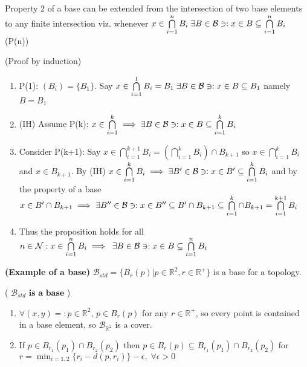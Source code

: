 \documentclass[11pt]{amsart}
\begin{document}
\begin{remark}
Property 2 of a base can be  extended from the  intersection of two base elements to any finite intersection viz. whenever $x \in \bigcap\limits_{i =1}^n B_i \;  \exists B \in \mathcal{B} \ni : x \in B \subseteq  \bigcap\limits_{i  =1}^n B_i$ (P(n))
\begin{verify} (Proof by induction) 
\begin{enumerate}
\item P(1):  $(B_i) = \{B_1\}$. Say $x \in \bigcap\limits_{i  =1}^1 B_i = B_1\;  \exists B \in \mathcal{B} \ni : x \in B \subseteq B_1$ namely $B=B_1$
\item (IH) Assume P(k): $x \in \bigcap\limits_{i  =1}^k \implies  \exists B \in \mathcal{B} \ni : x \in B \subseteq  \bigcap\limits_{i  =1}^k B_i$
\item Consider P(k+1):  Say $x \in \bigcap\limits_{i  =1}^{k+1} B_i = (\bigcap\limits_{i  =1}^k B_i) \cap B_{k+1}$ so $x \in \bigcap\limits_{i  =1}^k B_i$ and $x \in B_{k+1}$. By (IH) $x \in \bigcap\limits_{i  =1}^k B_i \implies \exists B' \in \mathcal{B} \ni : x \in B' \subseteq \bigcap\limits_{i  =1}^k B_i$ and by the property of a base  $x \in B' \cap B_{k+1} \implies \exists B'' \in \mathcal{B} \ni : x \in B'' \subseteq B' \cap B_{k+1} \subseteq \bigcap\limits_{i  =1}^k \cap B_{k+1} = \bigcap\limits_{i  =1}^{k+1} B_i$
\item Thus the proposition holds for all $n \in \mathcal{N}: x \in \bigcap\limits_{i =1}^n B_i \implies \;  \exists B \in \mathcal{B} \ni : x \in B \subseteq  \bigcap\limits_{i  =1}^n B_i$
\end{enumerate}
\end{verify}
\end{remark}



\begin{example}{\textbf{(Example of a base)}} $\mathcal{B}_{std}  = \{B_r(p) | p \in \mathbb{R}^2, r \in \mathbb{R}^+\}$ is a base for a topology.
\begin{verify}  { (  $\mathcal{B}_{std} \textbf{ is a base}$  )       }
\begin{enumerate}
\item $\forall (x,y) =: p \in \mathbb{R}^2$,  $p \in B_r(p)$ for any $r \in \mathbb{R}^+$, so every point is contained in a base element, so  $\mathcal{B}_{\mathbb{R}^2}$ is a cover.
\item If $p \in B_{r_1}(p_1) \cap  B_{r_2}(p_2)$  then $p \in B_r(p) \subseteq B_{r_1}(p_1) \cap  B_{r_2}(p_2)$ for $r = \min_{i=1,2} \{r_i - d(p,r_i)\} -\epsilon, \; \forall \epsilon > 0$
\end{enumerate}
\end{verify}
\end{example}
\end{document}
